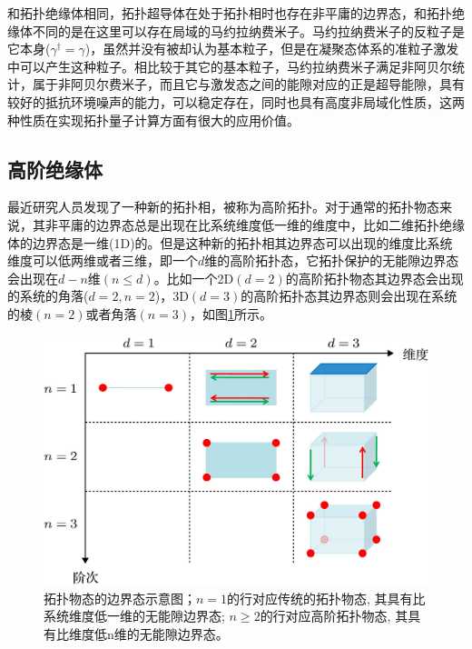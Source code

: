  和拓扑绝缘体相同，拓扑超导体在处于拓扑相时也存在非平庸的边界态，和拓扑绝缘体不同的是在这里可以存在局域的马约拉纳费米子\cite{re12,re13,re14,re15,re16}。马约拉纳费米子的反粒子是它本身($\gamma^\dagger=\gamma$)，虽然并没有被却认为基本粒子，但是在凝聚态体系的准粒子激发中可以产生这种粒子。相比较于其它的基本粒子，马约拉纳费米子满足非阿贝尔统计，属于非阿贝尔费米子，而且它与激发态之间的能隙对应的正是超导能隙，具有较好的抵抗环境噪声的能力，可以稳定存在，同时也具有高度非局域化性质，这两种性质在实现拓扑量子计算方面有很大的应用价值\cite{re17,re18}。
\subsection{高阶绝缘体}
 最近研究人员发现了一种新的拓扑相，被称为高阶拓扑\cite{re23,re24,re25,re26,re27,re28,re29,re30,re31,re32,re33,re34,re35,re36,re37,re38,re39,re40}。对于通常的拓扑物态来说，其非平庸的边界态总是出现在比系统维度低一维的维度中，比如二维拓扑绝缘体的边界态是一维(1D)的。但是这种新的拓扑相其边界态可以出现的维度比系统维度可以低两维或者三维，即一个$d$维的高阶拓扑态，它拓扑保护的无能隙边界态会出现在$d-n$维$(n\le d)$。比如一个2D$(d=2)$的高阶拓扑物态其边界态会出现的系统的角落($d=2,n=2$)，3D$(d=3)$的高阶拓扑态其边界态则会出现在系统的棱$(n=2)$或者角落$(n=3)$，如图\ref{fig6}所示。
\begin{figure}[h]
\centering
\includegraphics[scale=1.7]{pic/fig6}
\caption{拓扑物态的边界态示意图；$n=1$的行对应传统的拓扑物态, 其具有比系统维度低一维的无能隙边界态; $n\geq 2$的行对应高阶拓扑物态, 其具有比维度低n维的无能隙边界态\cite{re40}。}\label{fig6}
\end{figure}

